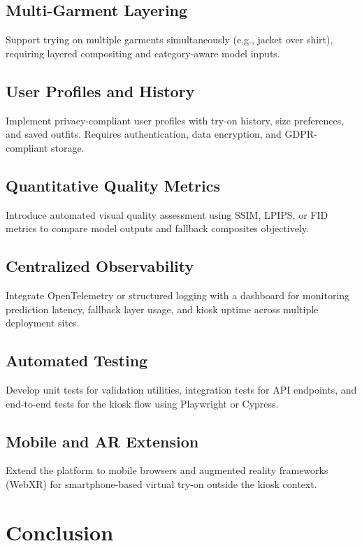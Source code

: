 \subsection{Multi-Garment Layering}

Support trying on multiple garments simultaneously (e.g., jacket over shirt), requiring layered compositing and category-aware model inputs.

\subsection{User Profiles and History}

Implement privacy-compliant user profiles with try-on history, size preferences, and saved outfits. Requires authentication, data encryption, and GDPR-compliant storage.

\subsection{Quantitative Quality Metrics}

Introduce automated visual quality assessment using SSIM, LPIPS, or FID metrics to compare model outputs and fallback composites objectively.

\subsection{Centralized Observability}

Integrate OpenTelemetry or structured logging with a dashboard for monitoring prediction latency, fallback layer usage, and kiosk uptime across multiple deployment sites.

\subsection{Automated Testing}

Develop unit tests for validation utilities, integration tests for API endpoints, and end-to-end tests for the kiosk flow using Playwright or Cypress.

\subsection{Mobile and AR Extension}

Extend the platform to mobile browsers and augmented reality frameworks (WebXR) for smartphone-based virtual try-on outside the kiosk context.

\section{Conclusion}
\label{sec:conclusion-final}

